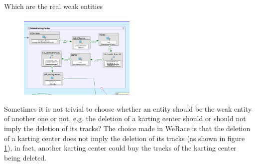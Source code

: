 \documentclass{beamer}
\newcommand{\kc}{WeRace}
\begin{document}
\begin{frame}{Which are the real weak entities}
    \scriptsize
    \begin{figure}
        \centering
        \includegraphics[width=0.5\textwidth]{drawio/del-karting-center.png}
        \label{fig:delete-karting-center}
    \end{figure}
    Sometimes it is not trivial to choose whether an entity should be the weak
    entity of another one or not, e.g. the deletion of a karting center should or 
    should not imply the deletion of its tracks?    
    The choice made in \kc{} is that the deletion of a karting center does 
    not imply the deletion of its tracks (as shown in figure \ref{fig:delete-karting-center}),
    in fact, another karting center could buy the tracks of the karting center being deleted.
\end{frame}
\end{document}
